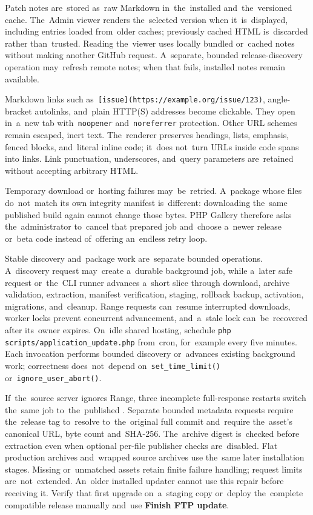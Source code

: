 \documentclass[11pt,a4paper]{article}
\newcommand{\filepath}[1]{\path{#1}}
\newcommand{\ui}[1]{\textbf{#1}}
\newcommand{\codeword}[1]{\nolinkurl{#1}}
\begin{document}
Patch notes are~stored as~raw Markdown in~the~installed
\filepath{PATCH_NOTES.md} and~the~versioned cache. The~Admin viewer renders
the~selected version when it~is~displayed, including entries loaded from~older
caches; previously cached HTML is~discarded rather than~trusted. Reading
the~viewer uses locally bundled or~cached notes without making another GitHub
request. A~separate, bounded release-discovery operation may~refresh remote
notes; when that fails, installed notes remain available.

Markdown links such as~\codeword{[issue](https://example.org/issue/123)},
angle-bracket autolinks, and~plain HTTP(S) addresses become clickable. They open
in~a~new tab with~\codeword{noopener} and~\codeword{noreferrer} protection.
Other URL schemes remain escaped, inert text. The~renderer preserves headings,
lists, emphasis, fenced blocks, and~literal inline code; it~does not~turn URLs
inside code spans into links. Link punctuation, underscores, and~query
parameters are~retained without accepting arbitrary HTML.


Temporary download or~hosting failures may~be~retried. A~package whose files
do~not~match its own integrity manifest is~different: downloading the~same
published build again cannot change those bytes. PHP Gallery therefore asks
the~administrator to~cancel that prepared job and~choose a~newer release or~beta
code instead of~offering an~endless retry loop.

Stable discovery and~package work are~separate bounded operations. A~discovery
request may~create a~durable background job, while a~later safe request
or~the~CLI runner advances a~short slice through download, archive validation,
extraction, manifest verification, staging, rollback backup, activation,
migrations, and~cleanup. Range requests can~resume interrupted downloads, worker
locks prevent concurrent advancement, and~a~stale lock can~be~recovered after
its~owner expires. On~idle shared hosting, schedule
\codeword{php scripts/application_update.php} from~cron, for~example every five
minutes. Each invocation performs bounded discovery or~advances existing
background work; correctness does~not~depend on~\codeword{set_time_limit()}
or~\codeword{ignore_user_abort()}.

If~the~source server ignores Range, three incomplete full-response
restarts switch the~same job to~the~published \filepath{production.zip}.
Separate bounded metadata requests require the~release tag to~resolve
to~the~original
full commit and~require the~asset's canonical URL, byte count and~SHA-256.
The~archive digest is~checked before extraction even when optional per-file
publisher checks are~disabled. Flat production archives and~wrapped source
archives use the~same later installation stages. Missing or~unmatched assets
retain finite failure handling; request limits are~not~extended.
An~older installed updater cannot use this repair before receiving it.
Verify that first upgrade on~a~staging copy or~deploy the~complete compatible
release manually and~use \ui{Finish FTP update}.
\end{document}
